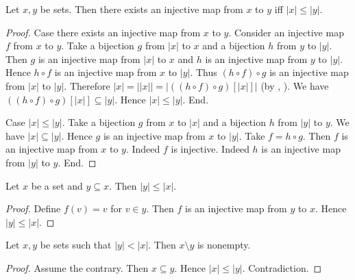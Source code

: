 \documentclass[10pt]{article}
\begin{document}
  \begin{forthel}
    \begin{proposition}
      Let $x, y$ be sets.
      Then there exists an injective map from $x$ to $y$ iff $|x| \leq |y|$.
    \end{proposition}
    \begin{proof}
      Case there exists an injective map from $x$ to $y$.
        Consider an injective map $f$ from $x$ to $y$.
        Take a bijection $g$ from $|x|$ to $x$ and a bijection $h$ from $y$ to $|y|$.
        Then $g$ is an injective map from $|x|$ to $x$ and $h$ is an injective map from $y$ to $|y|$.
        Hence $h \circ f$ is an injective map from $x$ to $|y|$.
        Thus $(h \circ f) \circ g$ is an injective map from $|x|$ to $|y|$.
        Therefore $|x|
          = ||x||
          = |((h \circ f) \circ g)[|x|]|$
        (by , ).
        We have $((h \circ f) \circ g)[|x|] \subseteq |y|$.
        Hence $|x| \leq |y|$.
      End.

      Case $|x| \leq |y|$.
        Take a bijection $g$ from $x$ to $|x|$ and a bijection $h$ from $|y|$ to $y$.
        We have $|x| \subseteq |y|$.
        Hence $g$ is an injective map from $x$ to $|y|$.
        Take $f = h \circ g$.
        Then $f$ is an injective map from $x$ to $y$.
        Indeed $f$ is injective.
        Indeed $h$ is an injective map from $|y|$ to $y$.
      End.
    \end{proof}
  \end{forthel}

  \begin{forthel}
    \begin{corollary}
      Let $x$ be a set and $y \subseteq x$.
      Then $|y| \leq |x|$.
    \end{corollary}
    \begin{proof}
      Define $f(v) = v$ for $v \in y$.
      Then $f$ is an injective map from $y$ to $x$.
      Hence $|y| \leq |x|$.
    \end{proof}
  \end{forthel}

  \begin{forthel}
    \begin{corollary}
      Let $x, y$ be sets such that $|y| < |x|$.
      Then $x \setminus y$ is nonempty.
    \end{corollary}
    \begin{proof}
      Assume the contrary.
      Then $x \subseteq y$.
      Hence $|x| \leq |y|$.
      Contradiction.
    \end{proof}
  \end{forthel}
\end{document}
